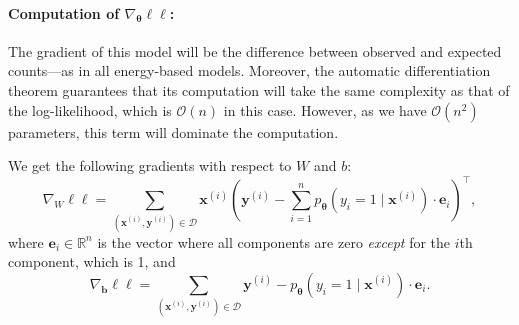 \documentclass[12pt]{article}
\renewcommand{\vec}{\boldsymbol}   %
\newcommand{\m}{m}
\newcommand{\lo}{\ell_1}
\newcommand{\lt}{\ell_2}
\newcommand{\All}{A_{\lt}^{\lo}}
\renewcommand{\xi}{\vec{x}^{(i)}}
\newcommand{\yi}{\vec{y}^{(i)}}
\newcommand{\vtheta}{\vec{\theta}}
\begin{document}
\paragraph{Computation of $\nabla_{\vtheta} \ell\ell$:}
The gradient of this model will be the difference between observed
and expected counts---as in all energy-based models. Moreover, the
automatic differentiation theorem guarantees that its computation
will take the same complexity as that of the log-likelihood, which is
$\mathcal{O}(n)$ in this case. However, as we have $\mathcal{O}(n^2)$
parameters, this term will dominate the computation.

We get the following gradients with respect to $W$ and $b$:
\begin{equation}
  \nabla_{W} \ell\ell = \sum_{(\xi, \yi) \in \mathcal{D}} \xi \left(\yi - \sum_{i=1}^n p_{\vtheta}(y_i = 1 \mid \xi) \cdot \vec{e}_i  \right)^{\top},
\end{equation}
where $\vec{e}_i \in \mathbb{R}^n$ is the vector where all components are zero {\em except} for the $i$th
component, which is 1, and
\begin{equation}
\nabla_{\vec{b}}\ell\ell = \sum_{(\xi, \yi) \in \mathcal{D}} \yi - p_{\vtheta}(y_i = 1 \mid \xi) \cdot \vec{e}_i .
\end{equation}


\end{document}
